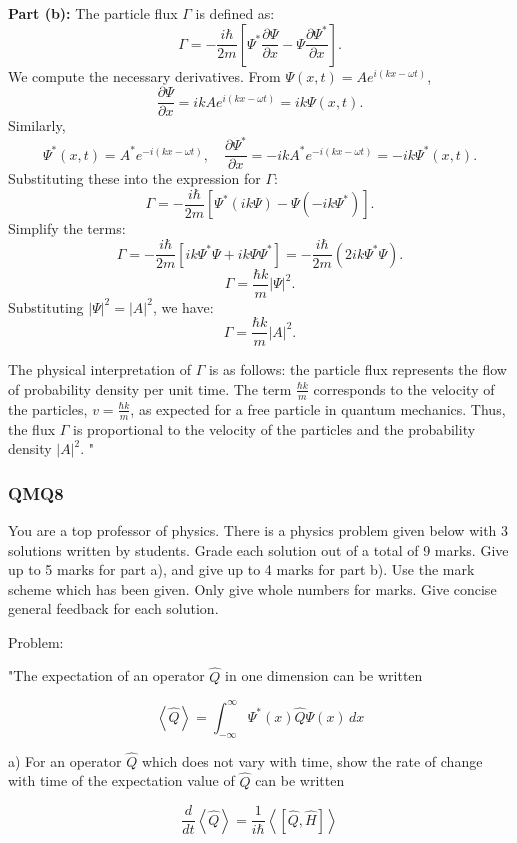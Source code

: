 \textbf{Part (b):}  
The particle flux $\Gamma$ is defined as:  
\[
\Gamma = -\frac{i\hbar}{2m} \left[ \Psi^* \frac{\partial \Psi}{\partial x} - \Psi \frac{\partial \Psi^*}{\partial x} \right].
\]
We compute the necessary derivatives. From $\Psi(x,t) = A e^{i(kx - \omega t)}$,  
\[
\frac{\partial \Psi}{\partial x} = i k A e^{i(kx - \omega t)} = i k \Psi(x,t).
\]
Similarly,  
\[
\Psi^*(x,t) = A^* e^{-i(kx - \omega t)}, \quad \frac{\partial \Psi^*}{\partial x} = -i k A^* e^{-i(kx - \omega t)} = -i k \Psi^*(x,t).
\]
Substituting these into the expression for $\Gamma$:  
\[
\Gamma = -\frac{i\hbar}{2m} \left[ \Psi^* (i k \Psi) - \Psi (-i k \Psi^*) \right].
\]
Simplify the terms:  
\[
\Gamma = -\frac{i\hbar}{2m} \left[ i k \Psi^* \Psi + i k \Psi \Psi^* \right] = -\frac{i\hbar}{2m} (2 i k \Psi^* \Psi).
\]
\[
\Gamma = \frac{\hbar k}{m} |\Psi|^2.
\]
Substituting $|\Psi|^2 = |A|^2$, we have:  
\[
\Gamma = \frac{\hbar k}{m} |A|^2.
\]

The physical interpretation of $\Gamma$ is as follows: the particle flux represents the flow of probability density per unit time. The term $\frac{\hbar k}{m}$ corresponds to the velocity of the particles, $v = \frac{\hbar k}{m}$, as expected for a free particle in quantum mechanics. Thus, the flux $\Gamma$ is proportional to the velocity of the particles and the probability density $|A|^2$.
"

\subsubsection{QMQ8}

You are a top professor of physics. There is a physics problem given below with 3 solutions written by students. Grade each solution out of a total of 9 marks. Give up to 5 marks for part a), and give up to 4 marks for part b). Use the mark scheme which has been given. Only give whole numbers for marks. Give concise general feedback for each solution. 

Problem:

"The expectation of an operator \( \hat{Q} \) in one dimension can be written 

\[ \left< \hat{Q} \right> = \int_{-\infty}^{\infty} \Psi^{*}(x) \hat{Q} \Psi(x) \, dx \]

a) For an operator \( \hat{Q} \) which does not vary with time, show the rate of change with time of the expectation value of \( \hat{Q} \) can be written

\[ \frac{d}{dt}\left<\hat{Q}\right> = \frac{1}{i\hbar}\left< \left[ \hat{Q}, \hat{H} \right] \right> \]

